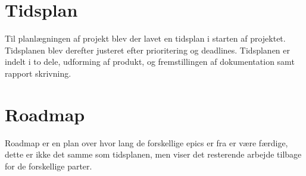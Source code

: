 \section{Tidsplan}

Til planlægningen af projekt blev der lavet en tidsplan i starten af projektet. Tidsplanen blev derefter justeret efter prioritering og deadlines. Tidsplanen er indelt i to dele, udforming af produkt, og fremstillingen af dokumentation samt rapport skrivning.


\section{Roadmap}

Roadmap er en plan over hvor lang de forskellige epics er fra er være færdige, dette er ikke det samme som tidsplanen, men viser det resterende arbejde tilbage for de forskellige parter.


